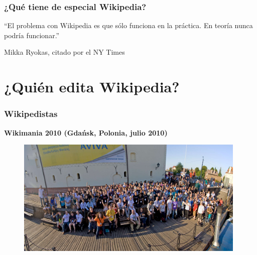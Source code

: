 

\begin{frame}
\frametitle{¿Qué tiene de especial Wikipedia?}

\Large{``El problema con Wikipedia es que sólo funciona en la práctica.
En teoría nunca podría funcionar.''}

\bigskip
\small{Mikka Ryokas, citado por el NY Times}

\end{frame}


\section{¿Quién edita Wikipedia?}


\begin{frame}
\frametitle{Wikipedistas}

\large{\textbf{Wikimania 2010 (Gdańsk, Polonia, julio 2010)}}

\begin{figure}[htp]
\centering
\includegraphics[width=11cm]{figs/wikimania-gdansk-2010.jpg}
\end{figure}

\end{frame}


